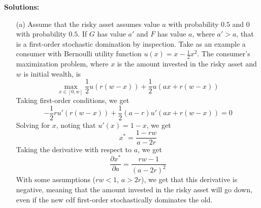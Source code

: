 \documentclass[12pt]{article}
\begin{document}
\medskip
\textbf{Solutions:}

\begin{itemize}
    \item[(a)] Assume that the risky asset assumes value $a$ with probability $0.5$ and $0$ with probability $0.5$. If $G$ has value $a'$ and $F$ has value $a$, where $a' > a$, that is a first-order stochastic domination by inspection. Take as an example a consumer with Bernoulli utility function $u(x) = x - \frac{1}{2} x^2$. The consumer's maximization problem, where $x$ is the amount invested in the risky asset and $w$ is initial wealth, is
    \[
    \max_{x \in [0,w]} \frac{1}{2} u(r(w-x)) + \frac{1}{2}u(ax + r(w-x))
    \]
    Taking first-order conditions, we get
    \[
        -\frac{1}{2}r u'(r(w-x)) + \frac{1}{2}(a-r) u'(ax + r(w-x)) = 0
    \]
    Solving for $x$, noting that $u'(x) = 1-x$, we get
    \[
    x^* = \frac{1 - rw}{a-2r}
    \]
    Taking the derivative with respect to $a$, we get
    \[
    \frac{\partial x^*}{\partial a} = \frac{rw - 1}{(a-2r)^2}
    \]
    With some assumptions ($rw < 1$, $a>2r$), we get that this derivative is negative, meaning that the amount invested in the risky asset will go down, even if the new cdf first-order stochastically dominates the old.


\end{itemize}
\end{document}
